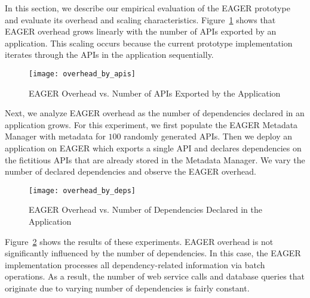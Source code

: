 In this section, we describe our empirical evaluation of the EAGER
prototype and evaluate its overhead and scaling characteristics.
Figure~\ref{fig:overhead_by_apis} shows that EAGER overhead grows linearly
with the number of APIs exported by an application.  This scaling occurs
because the current prototype implementation iterates through the APIs in the
application sequentially.

\begin{figure}
\centering
\texttt{[image: overhead\_by\_apis]}
\vspace{-0.01in}
\caption{EAGER Overhead vs. Number of APIs Exported by the Application}
\label{fig:overhead_by_apis}
\end{figure}

Next, we analyze EAGER overhead as the number of dependencies declared in
an application grows. For this experiment, we first populate the EAGER
Metadata Manager with metadata for $100$ randomly generated APIs. Then we
deploy an application on EAGER which exports a single API and declares
dependencies on the fictitious 
APIs that are already stored in the Metadata Manager. We
vary the number of declared dependencies and observe the EAGER overhead.

\begin{figure}
\centering
\texttt{[image: overhead\_by\_deps]}
\vspace{-0.01in}
\caption{EAGER Overhead vs. Number of Dependencies Declared in the Application}
\label{fig:overhead_by_deps}
\end{figure}

Figure~\ref{fig:overhead_by_deps} shows the results of these experiments. 
EAGER overhead is not significantly
influenced by the number of dependencies. 
In this case, the EAGER implementation processes
all dependency-related information via batch operations. 
As a result, the number of web service calls and database queries that originate 
due to varying number of dependencies is fairly constant. 